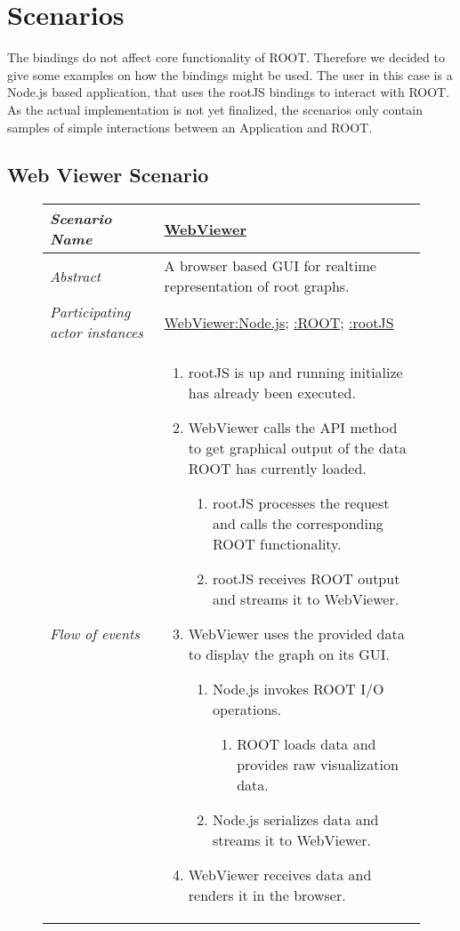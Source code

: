 \section{Scenarios}

The bindings do not affect core functionality of ROOT. Therefore 
we decided to give some examples on how the bindings might be used. The 
user in this case is a Node.js based application, that uses the rootJS bindings 
to interact with ROOT. As the actual implementation is not yet 
finalized, the scenarios only contain samples of simple interactions 
between an Application and ROOT.

\subsection{Web Viewer Scenario}
\begin{figure}[htb]
	\centering
	\begin{longtable}{p{3cm} @{\hskip 1cm} p{12cm}}
		\hline
		
		\textit{Scenario Name} & \underline{WebViewer}\\
		\hline
	
		\textit{Abstract} & A browser based GUI for realtime representation of root graphs.\\
		\hline
	
		\textit{Participating actor instances} & \underline{WebViewer:Node.js}; \underline{:ROOT}; \underline{:rootJS}\\
		\hline
	
		\textit{Flow of events} & 
		\begin{enumerate}
			\item rootJS is up and running initialize has already been executed.
			
			\item WebViewer calls the API method to get graphical output of the data ROOT has currently loaded.
				\begin{enumerate}
					\item rootJS processes the request and calls the corresponding ROOT functionality.
					\item rootJS receives ROOT output and streams it to WebViewer.
				\end{enumerate}
			\item WebViewer uses the provided data to display the graph on its GUI.
				\begin{enumerate}
					\item Node.js invokes ROOT I/O operations.
						\begin{enumerate}
							\item ROOT loads data and provides raw visualization data.
						\end{enumerate}
					\item Node.js serializes data and streams it to WebViewer.
				\end{enumerate}
			\item WebViewer receives data and renders it in the browser.
		\end{enumerate}
		\\
		\hline
		

\end{longtable}
\end{figure}
